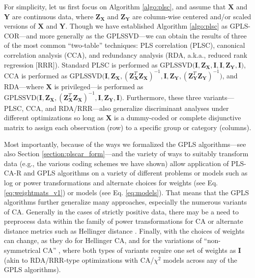 \documentclass[12pt]{article}
\begin{document}
For simplicity, let us first focus on Algorithm \ref{algo:plsc}, and
assume that \({\mathbf X}\) and \({\mathbf Y}\) are continuous data,
where \({\mathbf Z}_{\mathbf X}\) and \({\mathbf Z}_{\mathbf Y}\) are
column-wise centered and/or scaled versions of \({\mathbf X}\) and
\({\mathbf Y}\). Though we have established Algorithm \ref{algo:plsc} as
GPLS-COR---and more generally as the GPLSSVD---we can obtain the results
of three of the most common ``two-table'' techniques: PLS correlation
(PLSC), canonical correlation analysis (CCA), and redundancy analysis
(RDA, a.k.a., reduced rank regression {[}RRR{]}). Standard PLSC is
performed as
\(\mathrm{GPLSSVD(} {\mathbf I}, {\mathbf Z}_{{\mathbf X}}, {\mathbf I}, {\mathbf I}, {\mathbf Z}_{{\mathbf Y}}, {\mathbf I}\mathrm{)}\),
CCA is performed as
\(\mathrm{GPLSSVD(} {\mathbf I}, {\mathbf Z}_{{\mathbf X}}, ({\mathbf Z}_{\mathbf X}^{T}{\mathbf Z}_{\mathbf X})^{-1}, {\mathbf I}, {\mathbf Z}_{{\mathbf Y}}, ({\mathbf Z}_{\mathbf Y}^{T}{\mathbf Z}_{\mathbf Y})^{-1}\mathrm{)}\),
and RDA---where \({\mathbf X}\) is privileged---is performed as
\(\mathrm{GPLSSVD(} {\mathbf I}, {\mathbf Z}_{{\mathbf X}}, ({\mathbf Z}_{\mathbf X}^{T}{\mathbf Z}_{\mathbf X})^{-1}, {\mathbf I}, {\mathbf Z}_{{\mathbf Y}}, {\mathbf I}\mathrm{)}\).
Furthermore, these three variants---PLSC, CCA, and RDA/RRR---also
generalize discriminant analyses under different optimizations so long
as \({\mathbf X}\) is a dummy-coded or complete disjunctive matrix to
assign each observation (row) to a specific group or category (columns).

Most importantly, because of the ways we formalized the GPLS
algorithms---see also Section \ref{section:plscar_form}---and the
variety of ways to suitably transform data (e.g., the various coding
schemes we have shown) allow application of PLS-CA-R and GPLS algorithms
on a variety of different problems or models such as log or power
transformations and alternate choices for weights (see Eq.
\ref{eq:weightmats_v1}) or models (see Eq. \ref{eq:models}). That means
that the GPLS algorithms further generalize many approaches, especially
the numerous variants of CA. Generally in the cases of strictly positive
data, there may be a need to preprocess data within the family of power
transformations for CA \citep{greenacre2009power} or alternate distance
metrics such as Hellinger distance
\citep{rao1995review, escofier1978analyse}. Finally, with the choices of
weights can change, as they do for Hellinger CA, and for the variations
of ``non-symmetrical CA''
\citep{d1992non, kroonenberg1999nonsymmetric, takane1991relationships},
where both types of variants require one set of weights as
\({\mathbf I}\) (akin to RDA/RRR-type optimizations with CA/\(\chi^2\)
models across any of the GPLS algorithms).
\end{document}
